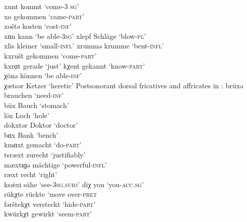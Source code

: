 {\ea\label{ex:15:21a} xunt \tab [xunt] \tab kommt \tab ‘come-\textsc{3} \textsc{sg}’ \\
    xo  \tab  [xo] \tab gekommen \tab ‘came-\textsc{part}’ \\
    xoštə \tab [xoʃtə] \tab kosten \tab ‘cost\textsc{{}-inf}’ \\
    xɑn  \tab  [xɑn] \tab kann \tab ‘be able-\textsc{3}\textsc{sg}’ 
\ex\label{ex:15:21b} xlepf \tab [xlepf] \tab Schläge \tab ‘blow-\textsc{pl}’ \\
    xlīs  \tab  [xliːs] \tab kleiner \tab ‘small-\textsc{infl}’ 
\ex\label{ex:15:21c} xrummə \tab [xrʊmmə] \tab krumme \tab ‘bent-\textsc{infl}’ \\
    kxrušt \tab [kxrʊʃt] \tab gekommen \tab ‘come-\textsc{part}’ \\
    kxrɑt \tab [krɑːt] \tab gerade \tab ‘just’ 
\ex\label{ex:15:21d} kχent \tab [kçent] \tab gekannt \tab ‘know-\textsc{part}’ \\
    χönə \tab [çønə] \tab können \tab ‘be able-\textsc{inf}’ \\
    χætsər \tab [çætsər] \tab Ketzer \tab ‘heretic’ 
\z 
\ex%
\label{ex:15:22}Postsonorant dorsal fricatives and affricates in :
\ea\label{ex:15:22a} brūxə \tab [bruːxə] \tab brauchen \tab ‘need-\textsc{inf}’ \\
     būx  \tab  [buːx] \tab Bauch \tab ‘stomach’ \\
     lōx  \tab  [loːx] \tab Loch \tab ‘hole’ \\
     dokxtər \tab [dokxtər] \tab Doktor \tab ‘doctor’ \\
     bɑx  \tab  [bɑx] \tab Bank \tab ‘bench’ \\
     kmɑxt \tab [kmɑxt] \tab gemacht \tab ‘do-\textsc{part}’ \\
\ex\label{ex:15:22b} tsræxt \tab [tsræxt] \tab zurecht \tab ‘justifiably’ \\
     mæxtɩɡə \tab [mæxtɪɡə] \tab mächtige \tab ‘powerful\textsc{{}-infl}’ \\
     ræxt \tab [ræxt] \tab recht \tab ‘right’ \\
     ks\={æ}xɩ \tab [ksæːxɪ] \tab sähe \tab ‘see-\textsc{3}\textsc{sg}.\textsc{subj}’ 
\ex\label{ex:15:22c} diχ  \tab  [ɪç] \tab you \tab ‘you-\textsc{acc}.\textsc{sg}’ \\
     rükχte \tab [rʏkçte] \tab rückte \tab ‘move over-\textsc{pret} \\
     fərštekχt \tab [fərʃtekçt] \tab versteckt \tab ‘hide-\textsc{part}’ \\
\ex\label{ex:15:22d}  kwürkχt \tab [kwʏrkçt] \tab gewirkt \tab ‘seem\textsc{{}-part}’ 
\z 
\z 

}
